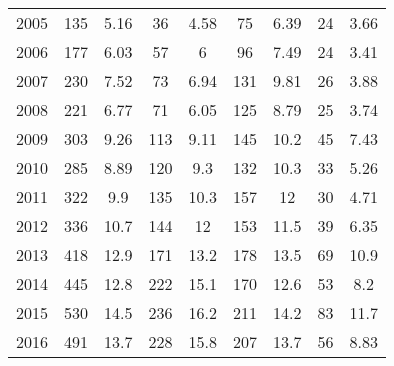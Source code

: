 \begin{table}[htbp]
\begin{tabular}{l*{8}{c}}
2005      &      135&     5.16&       36&     4.58&       75&     6.39&       24&     3.66\\
2006      &      177&     6.03&       57&        6&       96&     7.49&       24&     3.41\\
2007      &      230&     7.52&       73&     6.94&      131&     9.81&       26&     3.88\\
2008      &      221&     6.77&       71&     6.05&      125&     8.79&       25&     3.74\\
2009      &      303&     9.26&      113&     9.11&      145&     10.2&       45&     7.43\\
2010      &      285&     8.89&      120&      9.3&      132&     10.3&       33&     5.26\\
2011      &      322&      9.9&      135&     10.3&      157&       12&       30&     4.71\\
2012      &      336&     10.7&      144&       12&      153&     11.5&       39&     6.35\\
2013      &      418&     12.9&      171&     13.2&      178&     13.5&       69&     10.9\\
2014      &      445&     12.8&      222&     15.1&      170&     12.6&       53&      8.2\\
2015      &      530&     14.5&      236&     16.2&      211&     14.2&       83&     11.7\\
2016      &      491&     13.7&      228&     15.8&      207&     13.7&       56&     8.83\\
\hline\hline
\end{tabular}
\end{table}
